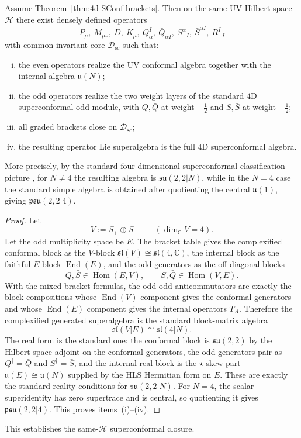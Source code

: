 \begin{theorem}
\label{thm:4d-SConf}
\label{thm:same-H-superconformal-realization}
Assume Theorem~\ref{thm:4d-SConf-brackets}. Then on the same UV Hilbert space
\(\mathcal H\) there exist densely defined operators
\[
P_\mu,\ M_{\mu\nu},\ D,\ K_\mu,\ Q_\alpha^I,\ \bar Q_{\dot\alpha I},\
S^\alpha{}_I,\ \bar S^{\dot\alpha I},\ R^I{}_J
\]
with common invariant core \(\mathcal D_{\mathrm{sc}}\) such that:
\begin{enumerate}[(i)]
  \item the even operators realize the UV conformal algebra together with the
        internal algebra \(\mathfrak u(N)\);
  \item the odd operators realize the two weight layers of the standard \(4\)D
        superconformal odd module, with \(Q,\bar Q\) at weight \(+\tfrac12\) and
        \(S,\bar S\) at weight \(-\tfrac12\);
  \item all graded brackets close on \(\mathcal D_{\mathrm{sc}}\);
  \item the resulting operator Lie superalgebra is the full \(4\)D
        superconformal algebra.
\end{enumerate}
More precisely, by the standard four-dimensional superconformal classification
picture \cite{Nahm1978,Sohnius:1985qm}, for \(N\neq 4\) the resulting algebra is
\(\mathfrak{su}(2,2|N)\), while in the \(N=4\) case the standard simple algebra is
obtained after quotienting the central \(\mathfrak u(1)\), giving
\(\mathfrak{psu}(2,2|4)\).
\end{theorem}

\begin{proof}
Let
\[
  V:=S_+\oplus S_-
  \qquad
  (\dim_\mathbb C V=4).
\]
Let the odd multiplicity space be \(E\). The bracket table gives the
complexified conformal block as the \(V\)-block
\(\mathfrak{sl}(V)\cong\mathfrak{sl}(4,\mathbb C)\), the internal block as the
faithful \(E\)-block \(\operatorname{End}(E)\), and the odd generators as the
off-diagonal blocks
\[
  Q,\bar S\in\operatorname{Hom}(E,V),
  \qquad
  S,\bar Q\in\operatorname{Hom}(V,E).
\]
With the mixed-bracket formulas, the odd-odd anticommutators are
exactly the block compositions whose \(\operatorname{End}(V)\) component gives
the conformal generators and whose \(\operatorname{End}(E)\) component gives the
internal operators \(T_A\). Therefore the complexified generated superalgebra is
the standard block-matrix algebra
\[
  \mathfrak{sl}(V|E)\cong\mathfrak{sl}(4|N).
\]
The real form is the standard one: the conformal block is
\(\mathfrak{su}(2,2)\) by the Hilbert-space adjoint on the conformal generators,
the odd generators pair as \(Q^\dagger=\bar Q\) and \(S^\dagger=\bar S\), and
the internal real block is the \(\star\)-skew part
\(\mathfrak u(E)\cong\mathfrak u(N)\) supplied by the HLS Hermitian form on
\(E\). These are exactly the standard reality conditions for
\(\mathfrak{su}(2,2|N)\). For \(N=4\), the scalar superidentity has zero
supertrace and is central, so quotienting it gives \(\mathfrak{psu}(2,2|4)\).
This proves items~\textnormal{(i)}--\textnormal{(iv)}.
\end{proof}

This establishes the same-\(\mathcal H\) superconformal closure.

